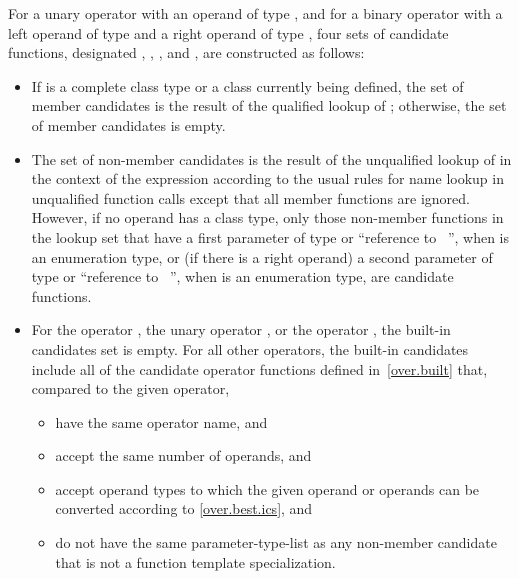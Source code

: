 \pnum
For a unary operator 
with an operand of type  ,
and for a binary operator 
with a left operand of type  
and a right operand of type  ,
four sets of candidate functions, designated
,
,
,
and
,
are constructed as follows:
\begin{itemize}
\item
If 
is a complete class type or a class currently being defined, the set of member candidates is the
result of the qualified lookup of
; otherwise, the set of member
candidates is empty.
\item
The set of non-member candidates is the result of the unqualified lookup of
in the context of
the expression according to the usual rules for name
lookup in unqualified function calls except
that all member functions are ignored.
However, if no operand has a class type, only those non-member
functions in the lookup set that have a first parameter of type
or ``reference to \cv{}~'',
when
is an enumeration type,
or (if there is a right operand) a second parameter of type
or ``reference to \cv{}~'',
when
is an enumeration type,
are candidate functions.
\item
For the operator
\tcode{,},
the unary operator
\tcode{\&},
or the operator
\tcode{->},
the built-in candidates set is empty.
For all other operators, the built-in candidates include all
of the candidate operator functions defined in~\ref{over.built} that,
compared to the given operator,
\begin{itemize}
\item
have the same operator name, and
\item
accept the same number of operands, and
\item
accept operand types to which the given operand or
operands can be converted according to \ref{over.best.ics}, and
\item
do not have the same parameter-type-list as any non-member candidate
that is not a function template specialization.
\end{itemize}


\end{itemize}
